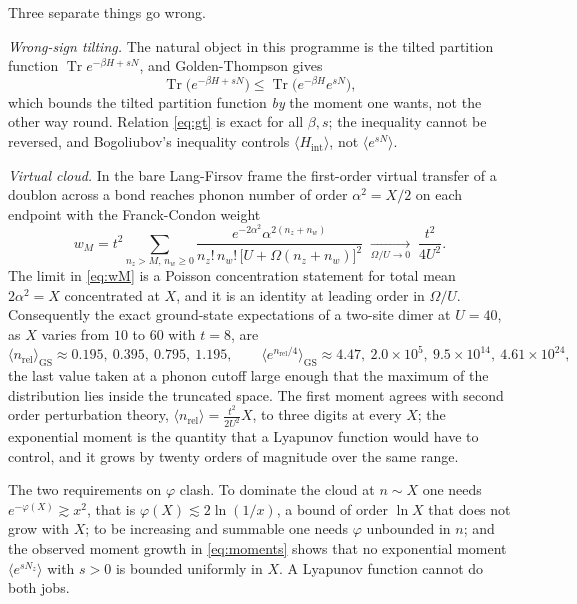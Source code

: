 \documentclass[11pt]{article}
\theoremstyle{definition}
\theoremstyle{remark}
\DeclareMathOperator{\Tr}{Tr}
\begin{document}
Three separate things go wrong.

\emph{Wrong-sign tilting.} The natural object in this programme is the tilted
partition function $\Tr e^{-\beta H+sN}$, and Golden-Thompson gives
\begin{equation}
\Tr\bigl(e^{-\beta H+sN}\bigr)\le\Tr\bigl(e^{-\beta H}e^{sN}\bigr),
\label{eq:gt}
\end{equation}
which bounds the tilted partition function \emph{by} the moment one wants, not
the other way round. Relation \eqref{eq:gt} is exact for all $\beta,s$; the
inequality cannot be reversed, and Bogoliubov's inequality controls
$\langle H_{\mathrm{int}}\rangle$, not $\langle e^{sN}\rangle$.

\emph{Virtual cloud.} In the bare Lang-Firsov frame the first-order virtual
transfer of a doublon across a bond reaches phonon number of order
$\alpha^{2}=X/2$ on each endpoint with the Franck-Condon weight
\begin{equation}
w_{M}=t^{2}\sum_{n_{z}>M,\,n_{w}\ge0}\frac{e^{-2\alpha^{2}}\alpha^{2(n_{z}+n_{w})}}
{n_{z}!\,n_{w}!\,\bigl[U+\Omega(n_{z}+n_{w})\bigr]^{2}}
\;\xrightarrow[\Omega/U\to0]{}\;\frac{t^{2}}{4U^{2}} .
\label{eq:wM}
\end{equation}
The limit in \eqref{eq:wM} is a Poisson concentration statement for total mean
$2\alpha^{2}=X$ concentrated at $X$, and it is an identity at leading order in
$\Omega/U$. Consequently the exact ground-state expectations of a two-site dimer
at $U=40$, as $X$ varies from $10$ to $60$ with $t=8$, are
\begin{equation}
\langle n_{\mathrm{rel}}\rangle_{\mathrm{GS}}\approx0.195,\ 0.395,\ 0.795,\ 1.195,
\qquad
\langle e^{n_{\mathrm{rel}}/4}\rangle_{\mathrm{GS}}\approx4.47,\ 2.0\times10^{5},\
9.5\times10^{14},\ 4.61\times10^{24},
\label{eq:moments}
\end{equation}
the last value taken at a phonon cutoff large enough that the maximum of the
distribution lies inside the truncated space. The first moment agrees with second
order perturbation theory, $\langle n_{\mathrm{rel}}\rangle=\frac{t^{2}}{2U^{2}}X$,
to three digits at every $X$; the exponential moment is the quantity that a
Lyapunov function would have to control, and it grows by twenty orders of
magnitude over the same range.

The two requirements on $\varphi$ clash. To dominate the cloud at $n\sim X$ one
needs $e^{-\varphi(X)}\gtrsim x^{2}$, that is $\varphi(X)\lesssim2\ln(1/x)$, a
bound of order $\ln X$ that does not grow with $X$; to be increasing and
summable one needs $\varphi$ unbounded in $n$; and the observed moment growth in
\eqref{eq:moments} shows that no exponential moment $\langle e^{sN_{z}}\rangle$
with $s>0$ is bounded uniformly in $X$. A Lyapunov function cannot do both jobs.
\end{document}
